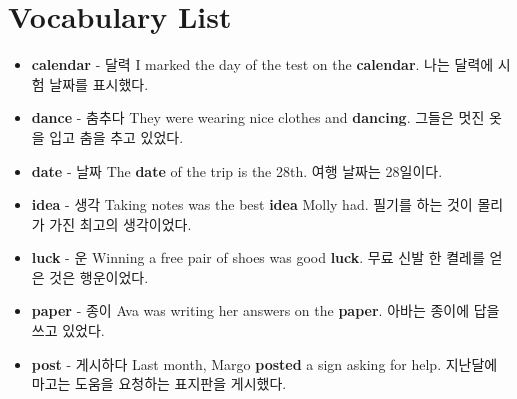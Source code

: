 \documentclass{article}
\begin{document}
\renewcommand{\familydefault}{\sfdefault}
\onehalfspacing

\section*{Vocabulary List}
\begin{addmargin}[1em]{1em}
    \begin{itemize}
        \item \fontsize{12pt}{14pt}\selectfont \textbf{calendar} - 달력 \newline
        I marked the day of the test on the \textbf{calendar}. \newline
        나는 달력에 시험 날짜를 표시했다.
        
        \item \fontsize{12pt}{14pt}\selectfont \textbf{dance} - 춤추다 \newline
        They were wearing nice clothes and \textbf{dancing}. \newline
        그들은 멋진 옷을 입고 춤을 추고 있었다.
        
        \item \fontsize{12pt}{14pt}\selectfont \textbf{date} - 날짜 \newline
        The \textbf{date} of the trip is the 28th. \newline
        여행 날짜는 28일이다.
        
        \item \fontsize{12pt}{14pt}\selectfont \textbf{idea} - 생각 \newline
        Taking notes was the best \textbf{idea} Molly had. \newline
        필기를 하는 것이 몰리가 가진 최고의 생각이었다.
        
        \item \fontsize{12pt}{14pt}\selectfont \textbf{luck} - 운 \newline
        Winning a free pair of shoes was good \textbf{luck}. \newline
        무료 신발 한 켤레를 얻은 것은 행운이었다.
        
        \item \fontsize{12pt}{14pt}\selectfont \textbf{paper} - 종이 \newline
        Ava was writing her answers on the \textbf{paper}. \newline
        아바는 종이에 답을 쓰고 있었다.
        
        \item \fontsize{12pt}{14pt}\selectfont \textbf{post} - 게시하다 \newline
        Last month, Margo \textbf{posted} a sign asking for help. \newline
        지난달에 마고는 도움을 요청하는 표지판을 게시했다.
        

\end{itemize}
\end{addmargin}
\end{document}
